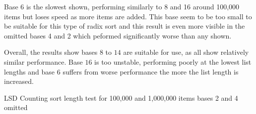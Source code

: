 \documentclass[12pt]{article}
\begin{document}
	\par
	Base $6$ is the slowest shown, performing similarly to 8 and 16 around 100,000 items but loses speed as more items are added. This base seem to be too small to be suitable for this type of radix sort and this result is even more visible in the omitted bases 4 and 2 which peformed significantly worse than any shown.
	\par
	Overall, the results show bases $8$ to $14$ are suitable for use, as all show relatively similar performance. Base $16$ is too unstable, performing poorly at the lowest list lengths and base $6$ suffers from worse performance the more the list length is increased.
	\begin{table}[h]
		\centering
		\captionsetup{type=figure}
			\caption{LSD Counting sort length test for 100,000 and 1,000,000 items \newline bases 2 and 4 omitted\label{fig:lsdclength}}
			
			
	\end{table}
	\pagebreak
\end{document}

